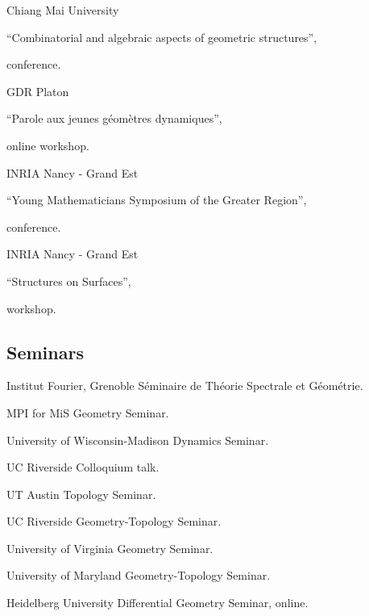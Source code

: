 {Chiang Mai University}
{``Combinatorial and algebraic aspects of geometric structures'', \begin{footnotesize}
		conference.
	\end{footnotesize}}
{}

{GDR Platon}
{``Parole aux jeunes g\'eom\`etres dynamiques'', 
	\begin{footnotesize}
		online workshop.
	\end{footnotesize}}
{}

{INRIA Nancy - Grand Est}
{``Young Mathematicians Symposium of the Greater Region'', \begin{footnotesize}
		conference.
\end{footnotesize}}
{}

{INRIA Nancy - Grand Est}
{``Structures on Surfaces'', \begin{footnotesize}
		workshop.
\end{footnotesize}}
{}
\vspace{-3em}

\subsection{Seminars}

{Institut Fourier, Grenoble}
{S\'eminaire de Th\'eorie Spectrale et G\'eom\'etrie.}
{}

{MPI for MiS}
{Geometry Seminar.}
{}

{University of Wisconsin-Madison}
{Dynamics Seminar.}
{}

{UC Riverside}
{Colloquium talk.}
{}

{UT Austin}
{Topology Seminar.}
{}

{UC Riverside}
{Geometry-Topology Seminar.}
{}

{University of Virginia}
{Geometry Seminar.}
{}

{University of Maryland}
{Geometry-Topology Seminar.}
{}

{Heidelberg University}
{Differential Geometry Seminar, online.}
{}

